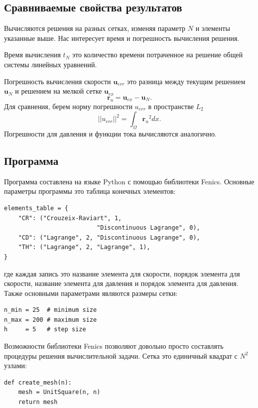 \documentclass[12pt]{article}
\begin{document}
\subsection{Сравниваемые свойства результатов}
Вычисляются решения на разных сетках, изменяя параметр $N$ и элементы указанные выше.
Нас интересует время и погрешность вычисления решения.

Время вычисления $t_N$ это количество времени потраченное на решение общей системы линейных уравнений.

Погрешность вычисления скорости $\bm u_{err}$ это разница между текущим решением $\bm u_N$ и решением на мелкой сетке $\bm u_{ex}$
\begin{equation}
{\bm r_{u}} = {\bm u_{ex}} - {\bm u_N}.
\end{equation}
Для сравнения, берем норму погрешности $u_{err}$ в пространстве $L_2$
\begin{equation}
||u_{err}||^2 = \int_{\Omega} {\bm r_{u}}^2 dx.
\end{equation}
Погрешности для давления и функции тока вычисляются аналогично.

\subsection{Программа}
Программа составлена на языке Python с помощью библиотеки Fenics.
Основные параметры программы это таблица конечных элементов:
\begin{lstlisting}
elements_table = {
    "CR": ("Crouzeix-Raviart", 1, 
                          "Discontinuous Lagrange", 0),
    "CD": ("Lagrange", 2, "Discontinuous Lagrange", 0),    
    "TH": ("Lagrange", 2, "Lagrange", 1),
}
\end{lstlisting}
где каждая запись это название элемента для скорости, порядок элемента для скорости, название элемента для давления и порядок элемента для давления. Также основными параметрами являются размеры сетки:
\begin{lstlisting}
n_min = 25  # minimum size
n_max = 200 # maximum size
h     = 5   # step size
\end{lstlisting}

Возможности библиотеки Fenics позволяют довольно просто составлять процедуры решения вычислительной задачи. Сетка это единичный квадрат с $N^2$ узлами:
\begin{lstlisting}
def create_mesh(n):
    mesh = UnitSquare(n, n)
    return mesh
\end{lstlisting}
\end{document}

